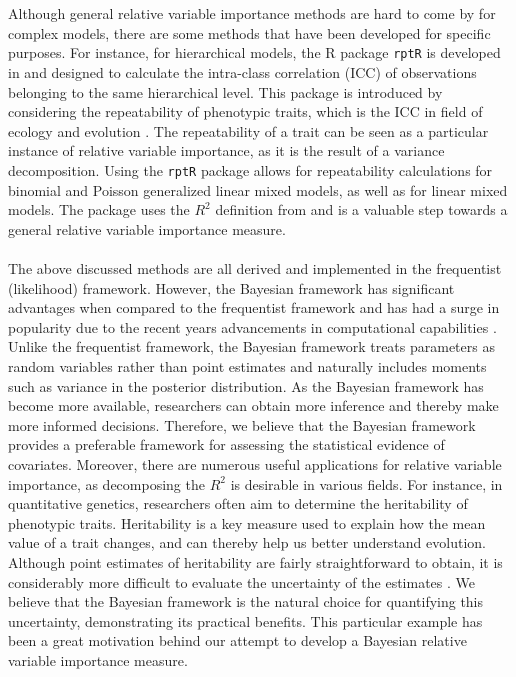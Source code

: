 \\
\\
Although general relative variable importance methods are hard to come by for complex models, there are some methods that have been developed for specific purposes. For instance, for hierarchical models, the R package \texttt{rptR} is developed in \citet{Stoffel2017rptR} and designed to calculate the intra-class correlation (ICC) of observations belonging to the same hierarchical level. This package is introduced by considering the repeatability of phenotypic traits, which is the ICC in field of ecology and evolution \citep{Stoffel2017rptR}. The repeatability of a trait can be seen as a particular instance of relative variable importance, as it is the result of a variance decomposition. Using the \texttt{rptR} package allows for repeatability calculations for binomial and Poisson generalized linear mixed models, as well as for linear mixed models. The package uses the $R^2$ definition from \citet{nakagawa2013general} and is a valuable step towards a general relative variable importance measure.
\\
\\
The above discussed methods are all derived and implemented in the frequentist (likelihood) framework. However, the Bayesian framework has significant advantages when compared to the frequentist framework \citep{robert2007bayesian} and has had a surge in popularity due to the recent years advancements in computational capabilities \citep{hackenberger2019bayes}. Unlike the frequentist framework, the Bayesian framework treats parameters as random variables rather than point estimates and naturally includes moments such as variance in the posterior distribution. As the Bayesian framework has become more available, researchers can obtain more inference and thereby make more informed decisions. Therefore, we believe that the Bayesian framework provides a preferable framework for assessing the statistical evidence of covariates. Moreover, there are numerous useful applications for relative variable importance, as decomposing the $R^2$ is desirable in various fields. For instance, in quantitative genetics, researchers often aim to determine the heritability of phenotypic traits. Heritability is a key measure used to explain how the mean value of a trait changes, and can thereby help us better understand evolution. Although point estimates of heritability are fairly straightforward to obtain, it is considerably more difficult to evaluate the uncertainty of the estimates \citep{Stoffel2017rptR}. We believe that the Bayesian framework is the natural choice for quantifying this uncertainty, demonstrating its practical benefits. This particular example has been a great motivation behind our attempt to develop a Bayesian relative variable importance measure.
